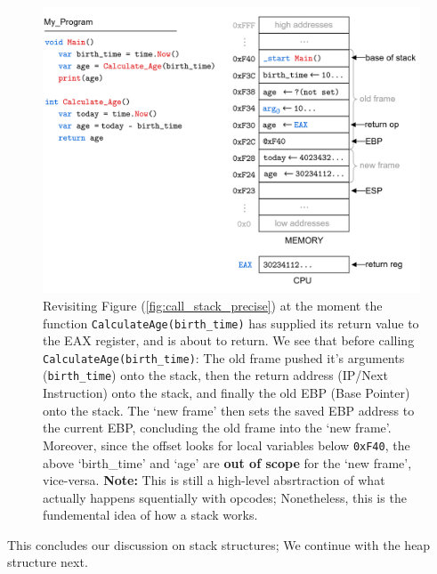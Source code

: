 \begin{figure}[!ht]
    \centering
    \includegraphics[width=\textwidth]{./Sections/stacks_heaps/call_stack_after.png}
    \caption{Revisiting Figure (\ref{fig:call_stack_precise}) at the moment the function \texttt{CalculateAge(birth\_time)} has supplied its return value to the EAX register, and is about to return.
    We see that before calling \texttt{CalculateAge(birth\_time)}: The old frame pushed it's arguments (\texttt{birth\_time}) onto the stack, then the return address (IP/Next Instruction) onto the stack,
    and finally the old EBP (Base Pointer) onto the stack. The `new frame' then sets the saved EBP address to the current EBP, concluding the old frame into the `new frame'. Moreover, since the offset
    looks for local variables below \texttt{0xF40}, the above `birth\_time' and `age' are \textbf{out of scope} for the `new frame', vice-versa. \textbf{Note:} This is 
    still a high-level absrtraction of what actually happens squentially with opcodes; Nonetheless, this is the fundemental idea of how a stack works. }
    \label{fig:call_stack_after}
\end{figure}

\noindent 
This concludes our discussion on stack structures; We continue with the heap structure next.
